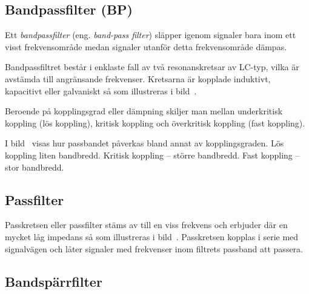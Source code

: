 \subsection{Bandpassfilter (BP)}


Ett \emph{bandpassfilter} (eng. \emph{band-pass filter}) släpper igenom signaler
bara inom ett visst frekvensområde medan signaler utanför detta frekvensområde
dämpas.

Bandpassfiltret består i enklaste fall av två resonanskretsar av LC-typ, vilka
är avstämda till angränsande frekvenser.
Kretsarna är kopplade induktivt, kapacitivt eller galvaniskt så som illustreras
i bild~.

Beroende på kopplingsgrad eller dämpning skiljer man mellan underkritisk
koppling (lös koppling), kritisk koppling och överkritisk koppling
(fast koppling).

I bild~ visas hur passbandet påverkas bland annat av
kopplingsgraden.
Lös koppling liten bandbredd.
Kritisk koppling -- större bandbredd.
Fast koppling -- stor bandbredd.



\subsection{Passfilter}

Passkretsen eller passfilter stäms av till en viss frekvens och erbjuder där
en mycket låg impedans så som illustreras i bild~.
Passkretsen kopplas i serie med signalvägen och låter signaler med
frekvenser inom filtrets passband att passera.


\subsection{Bandspärrfilter}

